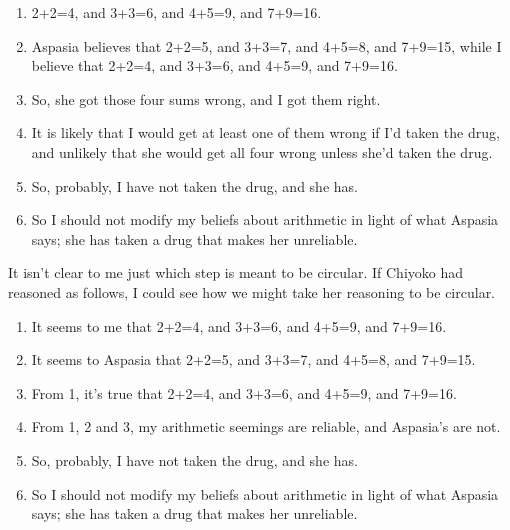 \documentclass[
  10pt,
  letterpaper,
  twoside]{scrbook}
\providecommand{\tightlist}{%
  \setlength{\itemsep}{0pt}\setlength{\parskip}{0pt}}\usepackage{longtable,booktabs,array}
\begin{document}
\begin{enumerate}
\def\labelenumi{\arabic{enumi}.}
\tightlist
\item
  2+2=4, and 3+3=6, and 4+5=9, and 7+9=16.
\item
  {Aspasia} believes that 2+2=5, and 3+3=7, and 4+5=8, and 7+9=15, while
  I believe that 2+2=4, and 3+3=6, and 4+5=9, and 7+9=16.
\item
  So, she got those four sums wrong, and I got them right.
\item
  It is likely that I would get at least one of them wrong if I'd taken
  the drug, and unlikely that she would get all four wrong unless she'd
  taken the drug.
\item
  So, probably, I have not taken the drug, and she has.
\item
  So I should not modify my beliefs about arithmetic in light of what
  {Aspasia} says; she has taken a drug that makes her unreliable.
\end{enumerate}

It isn't clear to me just which step is meant to be circular. If
{Chiyoko} had reasoned as follows, I could see how we might take her
reasoning to be circular.

\begin{enumerate}
\def\labelenumi{\arabic{enumi}.}
\tightlist
\item
  It seems to me that 2+2=4, and 3+3=6, and 4+5=9, and 7+9=16.
\item
  It seems to {Aspasia} that 2+2=5, and 3+3=7, and 4+5=8, and 7+9=15.
\item
  From 1, it's true that 2+2=4, and 3+3=6, and 4+5=9, and 7+9=16.
\item
  From 1, 2 and 3, my arithmetic seemings are reliable, and {Aspasia}'s
  are not.
\item
  So, probably, I have not taken the drug, and she has.
\item
  So I should not modify my beliefs about arithmetic in light of what
  {Aspasia} says; she has taken a drug that makes her unreliable.
\end{enumerate}
\end{document}
